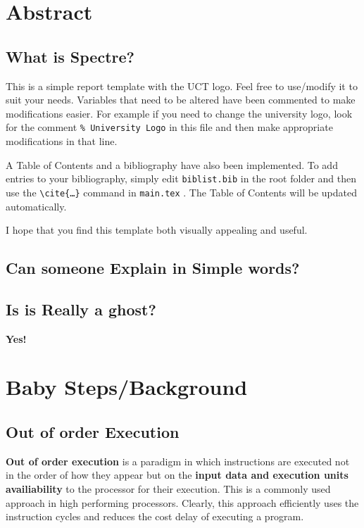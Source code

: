 \documentclass[12pt]{article}
\begin{document}

\tableofcontents
\pagebreak


\section{Abstract}
\subsection{What is Spectre?}
This is a simple report template with the UCT logo. Feel free to use/modify it to suit your needs. Variables that need to be altered have been commented to make modifications easier. For example if you need to change the university logo, look for the comment \texttt{\% University Logo} in this file and then make appropriate modifications in that line.

A Table of Contents and a bibliography have also been implemented. To add entries to your bibliography, simply edit \texttt{biblist.bib} in the root folder and then use the \texttt{\textbackslash cite\{\ldots\}} command in \texttt{main.tex} \cite{bibtex}. The Table of Contents will be updated automatically.

I hope that you find this template both visually appealing and useful. \\
\subsection{Can someone Explain in Simple words?}
\subsection{Is is Really a ghost?}
\textbf{Yes!}

\section{Baby Steps/Background}
\subsection{Out of order Execution}

\textbf{Out of order execution} is a paradigm in which instructions are executed not in the order of how they appear but on the \textbf{input data and execution units availiability} to the processor for their execution. This is a commonly used approach in high performing processors. Clearly, this approach efficiently uses the instruction cycles and reduces the cost delay of executing a program.  
\end{document}
